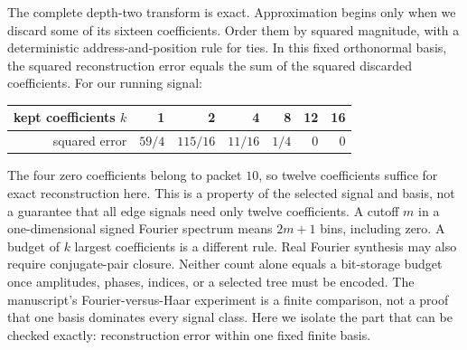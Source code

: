 The complete depth-two transform is exact. Approximation begins only when we discard some of its sixteen coefficients. Order them by squared magnitude, with a deterministic address-and-position rule for ties.
In this fixed orthonormal basis, the squared reconstruction error equals the sum of the squared discarded coefficients. For our running signal:
\begin{center}
\begin{tabular}{r|rrrrrr}
kept coefficients $k$ & 1&2&4&8&12&16\\\hline
squared error & $59/4$&$115/16$&$11/16$&$1/4$&$0$&$0$
\end{tabular}
\end{center}
The four zero coefficients belong to packet $10$, so twelve coefficients suffice for exact reconstruction here. This is a property of the selected signal and basis, not a guarantee that all edge signals need only twelve coefficients.
A cutoff $m$ in a one-dimensional signed Fourier spectrum means $2m+1$ bins, including zero. A budget of $k$ largest coefficients is a different rule. Real Fourier synthesis may also require conjugate-pair closure. Neither count alone equals a bit-storage budget once amplitudes, phases, indices, or a selected tree must be encoded.
The manuscript's Fourier-versus-Haar experiment is a finite comparison, not a proof that one basis dominates every signal class. Here we isolate the part that can be checked exactly: reconstruction error within one fixed finite basis.

